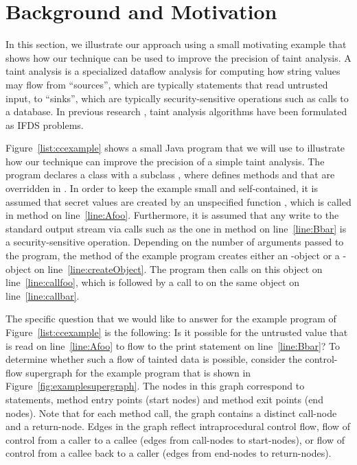 \section{Background and Motivation}
  \label{sec:MotivatingExample}
  
In this section, we illustrate our approach using a small motivating example that
shows how our technique can be used to improve the precision of taint analysis.
A taint analysis is a specialized dataflow analysis for computing how string values
may flow from ``sources'', which are typically statements that read untrusted input, 
to ``sinks'', which are typically security-sensitive
operations such as calls to 
a database. In previous research \cite{DBLP:conf/issta/GuarnieriPTDTB11,DBLP:conf/pldi/ArztRFBBKTOM14}, 
taint analysis algorithms have been formulated as IFDS problems.     
  

  
Figure~\ref{list:ccexample} shows a small Java program that we will use to illustrate
how our technique can improve the precision of a simple taint analysis. The program
declares a class  with a subclass ,  where  defines methods 
 and  that are overridden in .  In order to keep the 
example small and self-contained, it is assumed  that secret values are created by 
an unspecified function , which is called in method  on 
line~\ref{line:Afoo}. Furthermore, it is assumed that any write to the standard output 
stream via calls  such as the one in method  
on line~\ref{line:Bbar} is a security-sensitive operation. Depending on the number of 
arguments passed to the program, the  method of the example program creates 
either an -object or a -object on line~\ref{line:createObject}. The 
program then calls  on this object on line~\ref{line:callfoo}, which is 
followed by a call to  on the same object on line~\ref{line:callbar}.  
 
The specific question that we would like to answer for the example program of
Figure~\ref{list:ccexample} is the following: Is it possible for the untrusted value 
that is read on line~\ref{line:Afoo} to flow to the print statement on line~\ref{line:Bbar}? 
%
To determine whether such a flow of tainted data is possible, consider the control-flow
supergraph for the example program that is shown in Figure~\ref{fig:examplesupergraph}.
 The nodes in this graph correspond to statements, method entry points (start nodes) and 
method exit points (end nodes). Note that for each method call, the graph contains a 
distinct call-node and a return-node. Edges in the graph reflect intraprocedural control flow, 
flow of control from a caller to a callee (edges from call-nodes to start-nodes), or
flow of control from a callee back to a caller (edges from end-nodes to return-nodes). 

